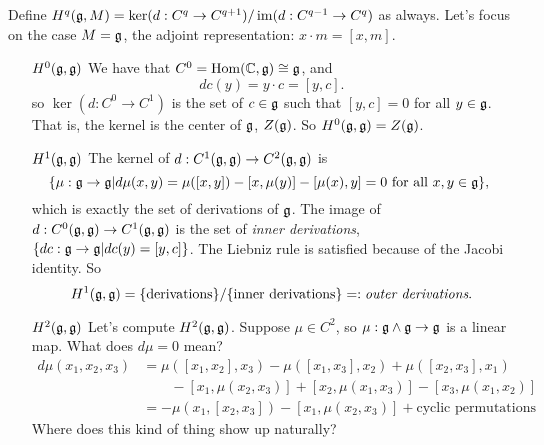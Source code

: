 Define $H^q(\mathfrak{g},M) = \ker(d:C^q\to C^{q+1})/\operatorname{im}(d:C^{q-1}\to C^q)$ as always. Let's
 focus on the case $M=\mathfrak{g}$, the adjoint representation:
 $x\cdot m = [x,m]$.
 \begin{itemize}
 \item[$H^0(\mathfrak{g},\mathfrak{g})$] We have that $C^0 = \operatorname{Hom}(\mathbb{C},\mathfrak{g})\cong \mathfrak{g}$, and
 \[
    dc(y) = y\cdot c = [y,c].
 \]
  so $\ker (d:C^0\to C^1)$ is the set of $c\in \mathfrak{g}$ such that $[y,c]=0$ for all $y\in \mathfrak{g}$.
  That is, the kernel is the center of $\mathfrak{g}$, $Z(\mathfrak{g})$. So $H^0(\mathfrak{g},\mathfrak{g})=Z(\mathfrak{g})$.

 \item[$H^1(\mathfrak{g},\mathfrak{g})$]\label{lec09H1(g,g)} The kernel of $d:C^1(\mathfrak{g},\mathfrak{g})\to C^2(\mathfrak{g},\mathfrak{g})$ is
 \[\!\!
 \{\mu:\mathfrak{g}\to \mathfrak{g}| d\mu(x,y)=\mu([x,y])-[x,\mu(y)]-[\mu(x),y]=0 \text{ for all }x,y\in
 \mathfrak{g}\},
 \]
 which is exactly the set of derivations of $\mathfrak{g}$.
%
%
 The image of $d:C^0(\mathfrak{g},\mathfrak{g})\to C^1(\mathfrak{g},\mathfrak{g})$ is the set of \emph{inner derivations},
 $\{dc:\mathfrak{g}\to \mathfrak{g}|dc(y)=[y,c]\}$.  The Liebniz rule is satisfied because of the Jacobi
 identity. So
 \[
    H^1(\mathfrak{g},\mathfrak{g}) = \{\text{derivations}\}/\{\text{inner derivations}\} =: \text{\em
    outer derivations}.
 \]

 \item[$H^2(\mathfrak{g},\mathfrak{g})$] Let's compute $H^2(\mathfrak{g},\mathfrak{g})$. Suppose $\mu\in C^2$, so
 $\mu:\mathfrak{g}\wedge\mathfrak{g}\to \mathfrak{g}$ is a linear map. What does $d\mu=0$ mean?
 \begin{align*}
    d\mu(x_1,x_2,x_3) &= \mu([x_1,x_2],x_3) - \mu([x_1,x_3],x_2) + \mu([x_2,x_3],x_1)
    \\ &\qquad - [x_1,\mu(x_2,x_3)]
    + [x_2,\mu(x_1,x_3)] - [x_3,\mu(x_1,x_2)]\\
     &= -\mu(x_1,[x_2,x_3]) - [x_1,\mu(x_2,x_3)] + \text{cyclic permutations}
 \end{align*}
 Where does this kind of thing show up naturally?


\end{itemize}
